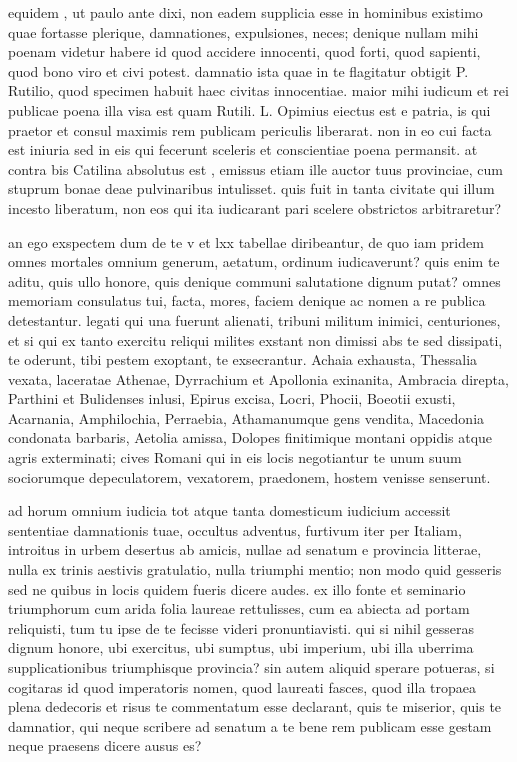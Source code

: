  equidem , ut paulo ante dixi, non eadem supplicia esse in hominibus existimo quae fortasse plerique, damnationes, expulsiones, neces; denique nullam mihi poenam videtur habere id quod accidere innocenti, quod forti, quod sapienti, quod bono viro et civi potest. damnatio ista quae in te flagitatur obtigit P. Rutilio, quod specimen habuit haec civitas innocentiae. maior mihi iudicum et rei publicae poena illa visa est quam Rutili. L. Opimius eiectus est e patria, is qui praetor et consul maximis rem publicam periculis liberarat. non in eo cui facta est iniuria sed in eis qui fecerunt sceleris et conscientiae poena permansit. at contra bis Catilina absolutus est , emissus etiam ille auctor tuus provinciae, cum stuprum bonae deae pulvinaribus intulisset. quis fuit in tanta civitate qui illum incesto liberatum, non eos qui ita iudicarant pari scelere obstrictos arbitraretur?

 an ego exspectem dum de te v et lxx tabellae diribeantur, de quo iam pridem omnes mortales omnium generum, aetatum, ordinum iudicaverunt? quis enim te aditu, quis ullo honore, quis denique communi salutatione dignum putat? omnes memoriam consulatus tui, facta, mores, faciem denique ac nomen a re publica detestantur. legati qui una fuerunt alienati, tribuni militum inimici, centuriones, et si qui ex tanto exercitu reliqui milites exstant non dimissi abs te sed dissipati, te oderunt, tibi pestem exoptant, te exsecrantur. Achaia exhausta, Thessalia vexata, laceratae Athenae, Dyrrachium et Apollonia exinanita, Ambracia direpta, Parthini et Bulidenses inlusi, Epirus excisa, Locri, Phocii, Boeotii exusti, Acarnania, Amphilochia, Perraebia, Athamanumque gens vendita, Macedonia condonata barbaris, Aetolia amissa, Dolopes finitimique montani oppidis atque agris exterminati; cives Romani qui in eis locis negotiantur te unum suum sociorumque depeculatorem, vexatorem, praedonem, hostem venisse senserunt.

 ad horum omnium iudicia tot atque tanta domesticum iudicium accessit sententiae damnationis tuae, occultus adventus, furtivum iter per Italiam, introitus in urbem desertus ab amicis, nullae ad senatum e provincia litterae, nulla ex trinis aestivis gratulatio, nulla triumphi mentio; non modo quid gesseris sed ne quibus in locis quidem fueris dicere audes. ex illo fonte et seminario triumphorum cum arida folia laureae rettulisses, cum ea abiecta ad portam reliquisti, tum tu ipse de te fecisse videri pronuntiavisti. qui si nihil gesseras dignum honore, ubi exercitus, ubi sumptus, ubi imperium, ubi illa uberrima supplicationibus triumphisque provincia? sin autem aliquid sperare potueras, si cogitaras id quod imperatoris nomen, quod laureati fasces, quod illa tropaea plena dedecoris et risus te commentatum esse declarant, quis te miserior, quis te damnatior, qui neque scribere ad senatum a te bene rem publicam esse gestam neque praesens dicere ausus es?

